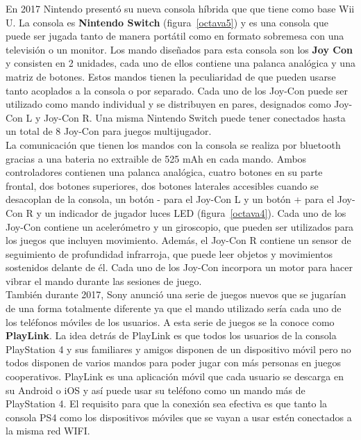 En 2017 Nintendo present\'o su nueva consola h\'ibrida que que tiene como base Wii U. La consola es \textbf{Nintendo Switch} (figura~\ref{octava5}) y es una consola que puede ser jugada tanto de manera port\'atil como en formato sobremesa con una televisi\'on o un monitor. Los mando dise\~nados para esta consola son los \textbf{Joy Con} y consisten en 2 unidades, cada uno de ellos contiene una palanca anal\'ogica y una matriz de botones. Estos mandos tienen la peculiaridad de que pueden usarse tanto acoplados a la consola o por separado. Cada uno de los Joy-Con puede ser utilizado como mando individual y se distribuyen en pares, designados como Joy-Con L y Joy-Con R. Una misma Nintendo Switch puede tener conectados hasta un total de 8 Joy-Con para juegos multijugador.\\

La comunicaci\'on que tienen los mandos con la consola se realiza por bluetooth gracias a una bateria no extraible de 525 mAh en cada mando. Ambos controladores contienen una palanca anal\'ogica, cuatro botones en su parte frontal, dos botones superiores, dos botones laterales accesibles cuando se desacoplan de la consola, un bot\'on - para el Joy-Con L y un bot\'on + para el Joy-Con R y un indicador de jugador luces LED (figura~\ref{octava4}). Cada uno de los Joy-Con contiene un aceler\'ometro y un giroscopio, que pueden ser utilizados para los juegos que incluyen movimiento. Adem\'as, el Joy-Con R contiene un sensor de seguimiento de profundidad infrarroja, que puede leer objetos y movimientos sostenidos delante de \'el. Cada uno de los Joy-Con incorpora un motor para hacer vibrar el mando durante las sesiones de juego.\\

Tambi\'en durante 2017, Sony anunci\'o una serie de juegos nuevos que se jugar\'ian de una forma totalmente diferente ya que el mando utilizado ser\'ia cada uno de los tel\'efonos m\'oviles de los usuarios. A esta serie de juegos se la conoce como \textbf{PlayLink}. La idea detr\'as de PlayLink es que todos los usuarios de la consola PlayStation 4 y sus familiares y amigos disponen de un dispositivo m\'ovil pero no todos disponen de varios mandos para poder jugar con m\'as personas en juegos cooperativos. PlayLink es una aplicaci\'on m\'ovil que cada usuario se descarga en su Android o iOS y as\'i puede usar su tel\'efono como un mando m\'as de PlayStation 4. El requisito para que la conexi\'on sea efectiva es que tanto la consola PS4 como los dispositivos m\'oviles que se vayan a usar est\'en conectados a la misma red WIFI.\\

